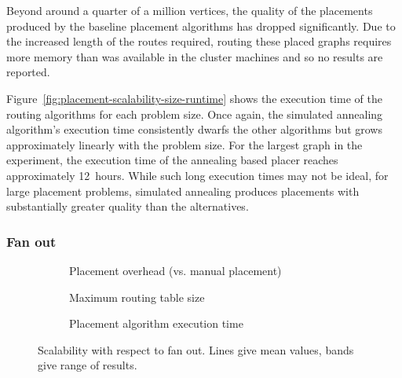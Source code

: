 				Beyond around a quarter of a million vertices, the quality of the
				placements produced by the baseline placement algorithms has dropped
				significantly. Due to the increased length of the routes required,
				routing these placed graphs requires more memory than was available in
				the cluster machines and so no results are reported.
				
				Figure~\ref{fig:placement-scalability-size-runtime} shows the execution
				time of the routing algorithms for each problem size. Once again, the
				simulated annealing algorithm's execution time consistently dwarfs the
				other algorithms but grows approximately linearly with the problem
				size. For the largest graph in the experiment, the execution time of
				the annealing based placer reaches approximately 12~hours. While such
				long execution times may not be ideal, for large placement problems,
				simulated annealing produces placements with substantially greater
				quality than the alternatives.
			
			\subsubsection{Fan out}
			
				\begin{figure}
					\center
					\begin{subfigure}{\linewidth}
						\center
						
						\caption{Placement overhead (vs. manual placement)}
						\label{fig:placement-scalability-fanout-quality}
					\end{subfigure}
					
					\vspace*{1em}
					
					\begin{subfigure}{\linewidth}
						\center
						
						\caption{Maximum routing table size}
						\label{fig:placement-scalability-fanout-entries}
					\end{subfigure}
					
					\vspace*{1em}
					
					\begin{subfigure}{\linewidth}
						\center
						
						\caption{Placement algorithm execution time}
						\label{fig:placement-scalability-fanout-runtime}
					\end{subfigure}
					
						\caption[Placer scalability with respect to fan out.]%
						{Scalability with respect to fan out. Lines give mean values,
						bands give range of results.}
					\label{fig:placement-scalability-fanout}
				\end{figure}
				
